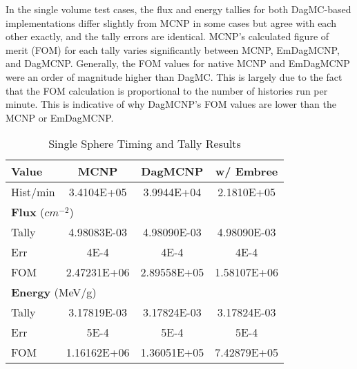 \documentclass{anstrans}
\begin{document}
In the single volume test cases, the flux and energy tallies for both DagMC-based implementations differ slightly from MCNP in some cases but agree with each other exactly, and the tally errors are identical. MCNP's calculated figure of merit (FOM) for each tally varies significantly between MCNP, EmDagMCNP, and DagMCNP. Generally, the FOM values for native MCNP and EmDagMCNP were an order of magnitude higher than DagMC. This is largely due to the fact that the FOM calculation is proportional to the number of histories run per minute. This is indicative of why DagMCNP's FOM values are lower than the MCNP or EmDagMCNP.

\begin{table}[h]

  \begin{center}
    \caption{Single Sphere Timing and Tally Results}

    \begin{tabular}{lccc}
      \toprule
      Value & MCNP & DagMCNP & w/ Embree \\
      \toprule
      Hist/min & 3.4104E+05  & 3.9944E+04  & 2.1810E+05  \\
      \hline
      \multicolumn{4}{l}{\textbf{Flux}  ($cm^{-2}$) } \\
      \hline
      Tally & 4.98083E-03 & 4.98090E-03 & 4.98090E-03 \\
      Err & 4E-4 & 4E-4 & 4E-4  \\
      FOM & 2.47231E+06 & 2.89558E+05 & 1.58107E+06 \\
      \hline
      \multicolumn{4}{l}{\textbf{Energy} (MeV/g)} \\
      \hline
      Tally & 3.17819E-03 & 3.17824E-03 & 3.17824E-03 \\
      Err & 5E-4 & 5E-4 & 5E-4 \\
      FOM & 1.16162E+06 & 1.36051E+05 & 7.42879E+05 \\      
      \bottomrule
                        
    \end{tabular}


  \end{center}

\end{table}
\end{document}
